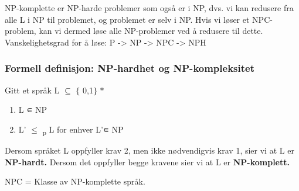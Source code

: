 \documentclass[12pt]{report}
\begin{document}

\par

NP-komplette er NP-harde problemer som også er i NP, dvs. vi kan redusere fra alle L i NP til problemet, og problemet er selv i NP. Hvis vi løser et NPC-problem, kan vi dermed løse alle NP-problemer ved å redusere til dette. Vanskelighetsgrad for å løse: P -> NP -> NPC -> NPH\par


\vspace{\baselineskip}
\subsubsection*{Formell definisjon: NP-hardhet og NP-kompleksitet}
Gitt et språk L $ \subseteq $  $ \{ $ 0,1$ \} $ $\ast$ \par

\begin{enumerate}
	\item L ∊ NP\par

	\item L’ $ \leq $ \textsubscript{p} L for enhver L’∊ NP
\end{enumerate}\par

Dersom språket L oppfyller krav 2, men ikke nødvendigvis krav 1, sier vi at L er\textbf{ NP-hardt. }Dersom det oppfyller begge kravene sier vi at L er \textbf{NP-komplett.}\par

NPC = Klasse av NP-komplette språk. \par


\vspace{\baselineskip}
\setlength{\parskip}{6.0pt}


\end{document}
